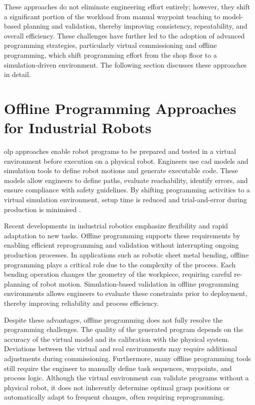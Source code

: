 These approaches do not eliminate engineering effort entirely; however, they shift a significant portion of the workload from manual waypoint teaching to model-based planning and validation, thereby improving consistency, repeatability, and overall efficiency. These challenges have further led to the adoption of advanced programming strategies, particularly virtual commissioning and offline programming, which shift programming effort from the shop floor to a simulation-driven environment. The following section discusses these approaches in detail.


\section{Offline Programming Approaches for Industrial Robots}
\label{sec:offline-programming-approaches}

\ac{olp} approaches enable robot programs to be prepared and tested in a virtual environment before execution on a physical robot. Engineers use \ac{cad} models and simulation tools to define robot motions and generate executable code. These models allow engineers to define paths, evaluate reachability, identify errors, and ensure compliance with safety guidelines. By shifting programming activities to a virtual simulation environment, setup time is reduced and trial-and-error during production is minimised \cite{Pan2012Survey}.

Recent developments in industrial robotics emphasize flexibility and rapid adaptation to new tasks. Offline programming supports these requirements by enabling efficient reprogramming and validation without interrupting ongoing production processes. In applications such as robotic sheet metal bending, offline programming plays a critical role due to the complexity of the process. Each bending operation changes the geometry of the workpiece, requiring careful re-planning of robot motion. Simulation-based validation in offline programming environments allows engineers to evaluate these constraints prior to deployment, thereby improving reliability and process efficiency.

Despite these advantages, offline programming does not fully resolve the programming challenges. The quality of the generated program depends on the accuracy of the virtual model and its calibration with the physical system. Deviations between the virtual and real environments may require additional adjustments during commissioning. Furthermore, many offline programming tools still require the engineer to manually define task sequences, waypoints, and process logic. Although the virtual environment can validate programs without a physical robot, it does not inherently determine optimal grasp positions or automatically adapt to frequent changes, often requiring reprogramming.

